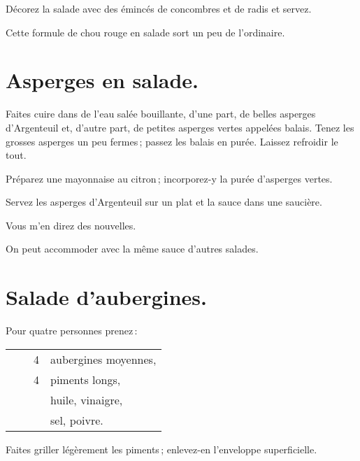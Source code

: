 Décorez la salade avec des émincés de concombres et de radis et servez.

Cette formule de chou rouge en salade sort un peu de l'ordinaire.

\section*{\centering Asperges en salade.}
{}

Faites cuire dans de l'eau salée bouillante, d'une part, de belles asperges
d'Argenteuil et, d'autre part, de petites asperges vertes appelées balais.
Tenez les grosses asperges un peu fermes ; passez les balais en purée. Laissez
refroidir le tout.

Préparez une mayonnaise au citron ; incorporez-y la purée d'asperges vertes.

Servez les asperges d'Argenteuil sur un plat et la sauce dans une saucière.

Vous m'en direz des nouvelles.

\sk

On peut accommoder avec la même sauce d’autres salades.

\section*{\centering Salade d'aubergines.}
{}

Pour quatre personnes prenez :

\footnotesize
\begin{longtable}{rrrp{16em}}
        &         &  4 & aubergines moyennes,                                                             \\
        &         &  4 & piments longs,                                                                   \\
        &         &    & huile, vinaigre,                                                                 \\
        &         &    & sel, poivre.                                                                     \\
\end{longtable}
\normalsize

Faites griller légèrement les piments ; enlevez-en l'enveloppe superficielle.

